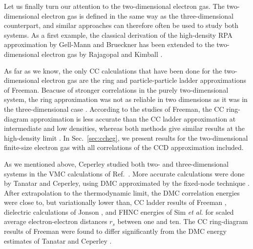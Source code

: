 \documentclass[a4paper,12pt]{report}
\begin{document}


Let us finally turn our attention to the two-dimensional
electron gas. The two-dimensional electron gas is defined
in the same way as the three-dimensional counterpart, and 
similar approaches can therefore often be used to 
study both systems. As a first example, the classical 
derivation of the high-density RPA approximation by Gell-Mann 
and Brueckner \cite{gellmann1957} has been extended to the 
two-dimensional electron gas by Rajagopal and Kimball 
\cite{rajagopal1977}. 

As far as we know, the only CC calculations that have been
done for the two-dimensional electron gas are the ring
\cite{freeman1978} and particle-particle ladder \cite{freeman1983}
approximations of Freeman. Beacuse of stronger correlations
in the purely two-dimensional system, the ring approximation
was not as reliable in two dimensions as it was in the 
three-dimensional case \cite{freeman1978}. According to the 
studies of Freeman, the CC ring-diagram approximation is 
less accurate than the CC ladder approximation at 
intermediate and low densities, whereas both methods give 
similar results at the high-density limit \cite{freeman1983}.
In Sec.~\ref{sec:ccheg}, we present results for the 
two-dimensional finite-size electron gas with all 
correlations of the CCD approximation included. 

As we mentioned above, Ceperley studied both two- and 
three-dimensional systems in the VMC calculations of
Ref.~\cite{ceperley1978}. More accurate calculations
were done by Tanatar and Ceperley, using DMC approximated
by the fixed-node technique \cite{tanatar_ceperley_1989}.
After extrapolation to the thermodynamic limit, the DMC 
correlation energies were close to, but variationally
lower than, CC ladder results of Freeman \cite{freeman1983}, 
dielectric calculations of Jonson \cite{jonson1976},
and FHNC energies of Sim \emph{et al.} \cite{sim1986}
for scaled average electron-electron distances 
$r_{s}$ between one and ten. The CC ring-diagram results 
of Freeman \cite{freeman1978} were found to differ 
significantly from the DMC energy estimates of 
Tanatar and Ceperley \cite{tanatar_ceperley_1989}. 
\end{document}
